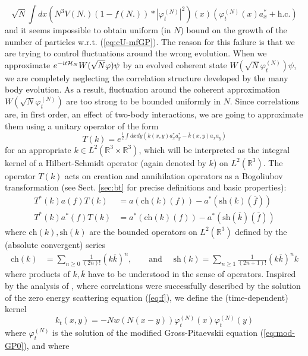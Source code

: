\documentclass[11pt,a4paper,DIV11]{scrartcl}	%
\newcommand{\bR}{{\mathbb R}}
\newcommand{\cH}{{\cal H}}
\begin{document}
\[  \sqrt{N} \int dx \left( N^3 V(N.) (1- f(N.)) * |\varphi^{(N)}_t|^2 \right) (x) \left( \varphi^{(N)}_t (x) a_x^* + \text{h.c.} \right)  \]
and it seems impossible to obtain uniform (in $N$) bound on the growth of the number of particles w.r.t. (\ref{eq:cU-mfGP}). The reason for this failure is that we are trying to control fluctuations around the wrong evolution. When we approximate $e^{-it \cH_N} W(\sqrt{N} \varphi) \psi$ by an evolved coherent state $W(\sqrt{N} \varphi^{(N)}_t) \psi$, we are completely neglecting the correlation structure developed by the many body evolution. As a result, fluctuation around the coherent approximation $W(\sqrt{N} \varphi^{(N)}_t)$ are too strong to be bounded uniformly in $N$. 
Since correlations are, in first order, an effect of two-body interactions, we are going to approximate them using a unitary operator of the form
\[ T(k) = e^{\frac{1}{2} \int dx dy \left(k(x,y) a_x^* a_y^* - \overline{k} (x,y) a_x a_y \right)} \]
for an appropriate $k \in L^2 (\bR^3 \times \bR^3)$, which will be interpreted as the integral kernel of a Hilbert-Schmidt operator (again denoted by $k$) on $L^2 (\bR^3)$. The operator $T(k)$ acts on creation and annihilation operators as a Bogoliubov transformation (see Sect. \ref{sec:bt} for precise definitions and basic properties):
\[ \begin{split} T^* (k) a (f) T (k) &= a(\text{ch} (k) (f)) - a^* (\text{sh} (k) (\overline{f})) \\
T^*(k) a^* (f) T (k) &= a^* (\text{ch} (k) (f)) - a^* (\text{sh} (\overline{k}) (\overline{f}))
\end{split} \]
where $\text{ch} (k), \text{sh} (k)$ are the bounded operators on $L^2 (\bR^3)$ defined by the (absolute convergent) series
\[ \begin{split} 
\text{ch} (k) & = \sum_{n\geq 0} \frac{1}{(2n)!} (k\overline{k})^n  , \qquad \text{and } \quad 
\text{sh} (k)   = \sum_{n \geq 1} \frac{1}{(2n+1)!} (k\overline{k})^n k \end{split} \]
where products of $k,\overline{k}$ have to be understood in the sense of operators. Inspired by the analysis of \cite{ESY1,ESY2,ESY3,ESY4}, where correlations were successfully described by the solution of the zero energy scattering equation (\ref{eq:f}), we define the (time-dependent) kernel 
\begin{equation}\label{eq:kt-def0} k_t (x,y) = - N w (N(x-y)) \varphi^{(N)}_t (x) \varphi^{(N)}_t (y) \end{equation}
where $\varphi^{(N)}_t$ is the solution of the modified Gross-Pitaevskii equation (\ref{eq:mod-GP0}), and where
\end{document}
